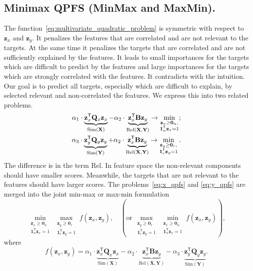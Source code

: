 \documentclass[12pt,oneside]{article}
\theoremstyle{definition}
\newcommand{\bz}{\mathbf{z}}
\newcommand{\bY}{\mathbf{Y}}
\newcommand{\bX}{\mathbf{X}}
\newcommand{\bB}{\mathbf{B}}
\newcommand{\bQ}{\mathbf{Q}}
\newcommand{\T}{\mathsf{T}}
\newcommand{\bOne}{\boldsymbol{1}}
\newcommand{\bZero}{\boldsymbol{0}}
\begin{document}
\subsection{Minimax QPFS (MinMax and MaxMin).}
The function~\eqref{eq:multivariate_quadratic_problem} is symmetric with respect to~$\bz_x$ and $\bz_y$.
It penalizes the features that are correlated and are not relevant to the targets.
At the same time it penalizes the targets that are correlated and are not sufficiently explained by the features.
It leads to small importances for the targets which are difficult to predict by the features and large importances for the targets which are strongly correlated with the features.
It contradicts with the intuition.
Our goal is to predict all targets, especially which are difficult to explain, by selected relevant and non-correlated the features. We express this into two related problems.
\begin{align}
	\alpha_1 \cdot \underbrace{\bz_x^{\T} \bQ_x \bz_x}_{\text{Sim}(\bX)} - \alpha_2 \cdot \underbrace{\vphantom{()} \bz_x^{\T}\mathbf{B} \bz_y}_{\text{Rel}(\bX, \bY)} \rightarrow \min_{\substack{\bz_x \geq \bZero_n, \\ \bOne_n^{\T}\bz_x=1}};
	\label{eq:x_qpfs}\\
	\alpha_3 \cdot \underbrace{\bz_y^{\T} \bQ_y \bz_y}_{\text{Sim}(\bY)} + \alpha_2 \cdot \underbrace{\vphantom{()} \bz_x^{\T} \mathbf{B} \bz_y}_{\text{Rel}(\bX, \bY)} \rightarrow \min_{\substack{\bz_y \geq \bZero_r,  \\ \bOne_r^{\T}\bz_y=1}}.
	\label{eq:y_qpfs}
\end{align}
The difference is in the term Rel.
In feature space the non-relevant components should have smaller scores.
Meanwhile, the targets that are not relevant to the features should have larger scores.
The problems~\eqref{eq:x_qpfs} and \eqref{eq:y_qpfs} are merged into the joint min-max or max-min formulation
\begin{equation}
	\min_{\substack{\bz_x \geq \bZero_n \\ \bOne_n^{\T}\bz_x=1}} 	\max_{\substack{\bz_y \geq \bZero_r \\ \bOne_r^{\T}\bz_y=1}} f(\bz_x, \bz_y), \quad \left(\text {or} \, \max_{\substack{\bz_y \geq \bZero_r \\ \bOne_r^{\T}\bz_y=1}} \min_{\substack{\bz_x \geq \bZero_n \\ \bOne_n^{\T}\bz_x=1}} f(\bz_x, \bz_y)\right),
	\label{eq:minmax}
\end{equation}
where
\begin{equation}
	f(\bz_x, \bz_y) = \alpha_1 \cdot \underbrace{\bz_x^{\T} \bQ_x \bz_x}_{\text{Sim}(\bX)} - \alpha_2 \cdot \underbrace{\bz_x^{\T} \bB \bz_y}_{\text{Rel}(\bX, \bY)} - \alpha_3 \cdot \underbrace{\bz_y^{\T} \bQ_y \bz_y}_{\text{Sim}(\bY)}.
\end{equation}
\end{document}
